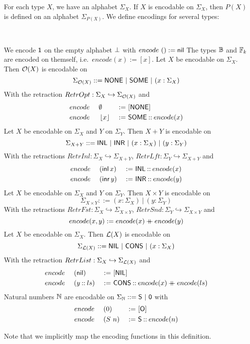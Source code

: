 For each type $X$, we have an alphabet $\Sigma_X$.  If $X$ is encodable on $\Sigma_X$, then $P(X)$ is defined on an alphabet $\Sigma_{P(X)}$.  We
define encodings for several types:
\begin{definition}
  \label{def:basic-encodings}
  ~
  \begin{enumerate}
   We encode $\mathsf{1}$ on the empty alphabet $\bot$ with $encode~\mathsf{()} := \mathsf{nil}$
   The types $\mathbb{B}$ and $\mathbb{F}_k$ are encoded on themself, i.e.\ $encode(x):=[x]$.
   Let $X$ be encodable on $\Sigma_X$.  Then $\mathcal{O}(X)$ is encodable on
    \[ \Sigma_{\mathcal{O}(X)} ::= \mathsf{NONE} ~|~ \mathsf{SOME} ~|~ (x:\Sigma_X) \]
    With the retraction $RetrOpt : \Sigma_X \hookrightarrow \Sigma_{\mathcal{O}(X)}$ and
    \begin{alignat*}{3}
      &encode~&&\emptyset  &~:=~& [\mathsf{NONE}] \\
      &encode~&&\left\lfloor {x} \right\rfloor&~:=~& \mathsf{SOME} \mathbin{::} encode(x)
    \end{alignat*}
   Let $X$ be encodable on $\Sigma_X$ and $Y$ on $\Sigma_Y$.  Then $X+Y$ is encodable on
    \[ \Sigma_{X+Y} ::= \mathsf{INL} ~|~ \mathsf{INR} ~|~ (x:\Sigma_X) ~|~ (y:\Sigma_Y) \] With the retractions
    $RetrInl : \Sigma_X \hookrightarrow \Sigma_{X+Y}$, $RetrLft : \Sigma_Y \hookrightarrow \Sigma_{X+Y}$ and
    \begin{alignat*}{3}
      &encode~&&(\operatorname{\mathsf{inl}} x)&~:=~& \mathsf{INL} \mathbin{::} encode(x) \\
      &encode~&&(\operatorname{\mathsf{inr}} y)&~:=~& \mathsf{INR} \mathbin{::} encode(y)
    \end{alignat*}
   Let $X$ be encodable on $\Sigma_X$ and $Y$ on $\Sigma_Y$.  Then $X \times Y$ is encodable on
    \[ \Sigma_{X \times Y} ::= (x:\Sigma_X) ~|~ (y:\Sigma_Y) \] With the retractions
    $RetrFst : \Sigma_X \hookrightarrow \Sigma_{X \times Y}$, $RetrSnd : \Sigma_Y \hookrightarrow \Sigma_{X \times Y}$ and
    \[
      encode(x,y) := encode(x) \mathbin{+\mkern-10mu+} encode(y)
    \]
   Let $X$ be encodable on $\Sigma_X$.  Then $\mathcal{L}(X)$ is encodable on
    \[ \Sigma_{\mathcal{L}(X)} ::= \mathsf{NIL} ~|~ \mathsf{CONS} ~|~ (x:\Sigma_X) \]
    With the retraction $RetrList : \Sigma_X \hookrightarrow \Sigma_{\mathcal{L}(X)}$ and
    \begin{alignat*}{3}
      &encode~&&(\mathsf{nil}      ) &~:=~& [\mathsf{NIL}] \\
      &encode~&&(y \mathbin{::} ls) &~:=~& \mathsf{CONS} \mathbin{::} encode(x) \mathbin{+\mkern-10mu+} encode(ls)
    \end{alignat*}
   Natural numbers $\mathbb{N}$ are encodable on $\Sigma_{\mathbb{N}} ::= \mathsf{S} ~|~ \mathsf{0} $ with
    \begin{alignat*}{3}
      &encode~&&(0  ) &~:=~& [\mathsf{O}] \\
      &encode~&&(S~n) &~:=~& \mathsf{S} \mathbin{::} encode(n)
    \end{alignat*}
  \end{enumerate}
  Note that we implicitly map the encoding functions in this definition.
\end{definition}

